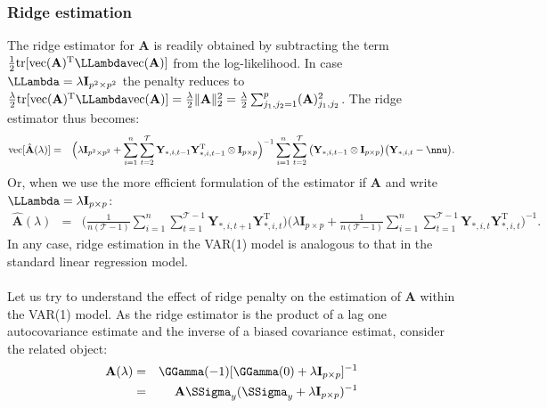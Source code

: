 \documentclass[a4paper]{article}
\theoremstyle{myexamplestyle}
\begin{document}
\subsubsection{Ridge estimation}
The ridge estimator for $\mathbf{A}$ is readily obtained by subtracting the term $\frac{1}{2} \mbox{tr}[\mbox{vec}(\mathbf{A})^\mathrm{T} \LLambda \mbox{vec}(\mathbf{A})]$ from the log-likelihood. In case $\LLambda = \lambda \mathbf{I}_{p^2 \times p^2}$ the penalty reduces to $\frac{\lambda}{2} \mbox{tr}[\mbox{vec}(\mathbf{A})^\mathrm{T} \LLambda \mbox{vec}(\mathbf{A})] = \frac{\lambda}{2} \| \mathbf{A} \|_2^2 = \frac{\lambda}{2} \sum_{j_1, j_2 = 1}^p (\mathbf{A})_{j_1, j_2}^2$.
The ridge estimator thus becomes:
\begin{eqnarray*}
\mbox{vec}[\hat{\mathbf{A}}(\lambda)] & = &
\Big(\lambda \mathbf{I}_{p^2 \times p^2} +
\sum_{i=1}^n \sum_{t=2}^{\mathcal{T}} \mathbf{Y}_{\ast,i,t-1} \mathbf{Y}_{\ast,i,t-1}^{\mathrm{T}} \otimes \mathbf{I}_{p \times p}
\Big)^{-1}
\sum_{i=1}^n \sum_{t=2}^{\mathcal{T}} \big( \mathbf{Y}_{\ast,i,t-1}  \otimes \mathbf{I}_{p \times p} \big)
\big(\mathbf{Y}_{\ast,i,t} - \nnu \big).
\end{eqnarray*}
Or, when we use the more efficient formulation of the estimator if $\mathbf{A}$ and write $\LLambda = \lambda \mathbf{I}_{p \times p}$:
\begin{eqnarray} \label{form.ridge.estimator}
\hat{\mathbf{A}}(\lambda) & = &  \Big( \frac{1}{n(\mathcal{T}-1)} \sum_{i=1}^n \sum_{t=1}^{\mathcal{T}-1}  \mathbf{Y}_{\ast,i,t+1} \mathbf{Y}_{\ast,i,t}^{\mathrm{T}} \Big) \Big( \lambda \mathbf{I}_{p \times p} +  \frac{1}{n({\mathcal{T}}-1)} \sum_{i=1}^n \sum_{t=1}^{{\mathcal{T}}-1}  \mathbf{Y}_{\ast,i,t} \mathbf{Y}_{\ast,i,t}^{\mathrm{T}} \Big)^{-1}.
\end{eqnarray}
In any case, ridge estimation in the VAR(1) model is analogous to that in the standard linear regression model.
\\
\\
Let us try to understand the effect of ridge penalty on the estimation of $\mathbf{A}$ within the VAR(1) model. As the ridge estimator is the product of a lag one autocovariance estimate and the inverse of a biased covariance estimat, consider the related object:
\begin{eqnarray*}
\mathbf{A}(\lambda) & = & \GGamma(-1) [\GGamma(0) + \lambda \mathbf{I}_{p \times p}]^{-1}
\\
& = & \mathbf{A} \SSigma_y (\SSigma_y + \lambda \mathbf{I}_{p \times p})^{-1}
\end{eqnarray*}
\end{document}
